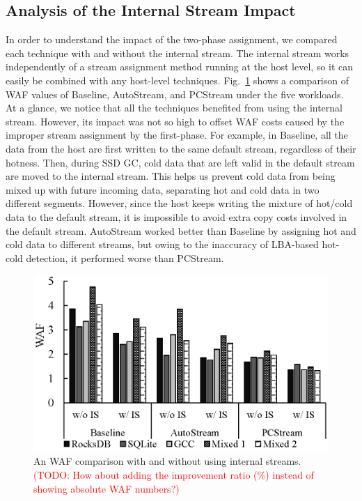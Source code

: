 \subsection{Analysis of the Internal Stream Impact}

In order to understand the impact of the two-phase assignment, we compared each
technique with and without the internal stream.  The internal stream works
independently of a stream assignment method running at the host level, so it
can easily be combined with any host-level techniques.  Fig.~\ref{fig:internal}
shows a comparison of WAF values of Baseline, AutoStream, and PCStream under
the five workloads.  At a glance, we notice that all the techniques benefited
from using the internal stream.  However, its impact was not so high to offset
WAF costs caused by the improper stream assignment by the first-phase.  For
example, in Baseline, all the data from the host are first written to the same
default stream, regardless of their hotness.  Then, during SSD GC, cold data
that are left valid in the default stream are moved to the internal stream.
This helps us prevent cold data from being mixed up with future incoming data,
separating hot and cold data in two different segments. However, since the host
keeps writing the mixture of hot/cold data to the default stream, it is
impossible to avoid extra copy costs involved in the default stream.
AutoStream worked better than Baseline by assigning hot and cold data to
different streams, but owing to the inaccuracy of LBA-based hot-cold detection,
it performed worse than PCStream.

\begin{figure}[t]
	\centering
	\includegraphics[width=0.9\linewidth]{figure/internal}
	\caption{An WAF comparison with and without using internal streams.
		\textcolor{red}{(TODO: How about adding
		the improvement ratio (\%) instead of showing absolute WAF numbers?)} 
	}
	\label{fig:internal}
\end{figure}


